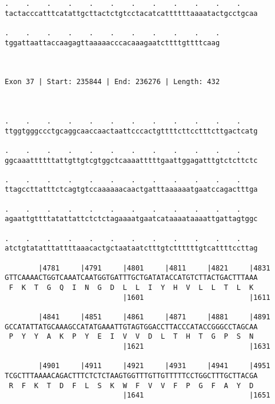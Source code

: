 \documentclass{article}
\begin{document}
\begin{Verbatim}
.    .    .    .    .    .    .    .    .    .    .    .    
tactacccatttcatattgcttactctgtcctacatcattttttaaaatactgcctgcaa
                                                            
.    .    .    .    .    .    .    .    .    .    .
tggattaattaccaagagttaaaaacccacaaagaatcttttgttttcaag
                                                   
                                                   
 
Exon 37 | Start: 235844 | End: 236276 | Length: 432



.    .    .    .    .    .    .    .    .    .    .    .    
ttggtgggccctgcaggcaaccaactaattcccactgttttcttcctttcttgactcatg
                                                            
.    .    .    .    .    .    .    .    .    .    .    .    
ggcaaattttttattgttgtcgtggctcaaaatttttgaattggagatttgtctcttctc
                                                            
.    .    .    .    .    .    .    .    .    .    .    .    
ttagccttatttctcagtgtccaaaaaacaactgatttaaaaaatgaatccagactttga
                                                            
.    .    .    .    .    .    .    .    .    .    .    .    
agaattgttttatattattctctctagaaaatgaatcataaaataaaattgattagtggc
                                                            
.    .    .    .    .    .    .    .    .    .    .    .    
atctgtatatttattttaaacactgctaataatctttgtcttttttgtcattttccttag
                                                            
        |4781     |4791     |4801     |4811     |4821     |4831
GTTCAAAACTGGTCAAATCAATGGTGATTTGCTGATATACCATGTCTTACTGACTTTAAA
 F  K  T  G  Q  I  N  G  D  L  L  I  Y  H  V  L  L  T  L  K 
                            |1601                         |1611
  
        |4841     |4851     |4861     |4871     |4881     |4891
GCCATATTATGCAAAGCCATATGAAATTGTAGTGGACCTTACCCATACCGGGCCTAGCAA
 P  Y  Y  A  K  P  Y  E  I  V  V  D  L  T  H  T  G  P  S  N 
                            |1621                         |1631
  
        |4901     |4911     |4921     |4931     |4941     |4951
TCGCTTTAAAACAGACTTTCTCTCTAAGTGGTTTGTTGTTTTTCCTGGCTTTGCTTACGA
 R  F  K  T  D  F  L  S  K  W  F  V  V  F  P  G  F  A  Y  D 
                            |1641                         |1651
  

\end{Verbatim}
\end{document}
